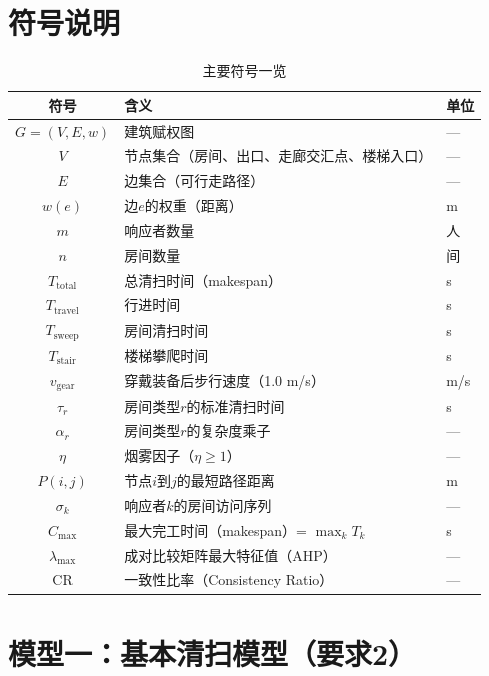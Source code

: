 \documentclass[12pt,a4paper]{ctexart}
\begin{document}
\section{符号说明}

\begin{table}[htbp]
\centering
\caption{主要符号一览}
\label{tab:notation}
\begin{tabular}{cll}
\toprule
\textbf{符号} & \textbf{含义} & \textbf{单位} \\
\midrule
$G=(V,E,w)$ & 建筑赋权图 & — \\
$V$ & 节点集合（房间、出口、走廊交汇点、楼梯入口） & — \\
$E$ & 边集合（可行走路径） & — \\
$w(e)$ & 边$e$的权重（距离） & m \\
$m$ & 响应者数量 & 人 \\
$n$ & 房间数量 & 间 \\
$T_{\text{total}}$ & 总清扫时间（makespan） & s \\
$T_{\text{travel}}$ & 行进时间 & s \\
$T_{\text{sweep}}$ & 房间清扫时间 & s \\
$T_{\text{stair}}$ & 楼梯攀爬时间 & s \\
$v_{\text{gear}}$ & 穿戴装备后步行速度（1.0 m/s） & m/s \\
$\tau_r$ & 房间类型$r$的标准清扫时间 & s \\
$\alpha_r$ & 房间类型$r$的复杂度乘子 & — \\
$\eta$ & 烟雾因子（$\eta\geq 1$） & — \\
$P(i,j)$ & 节点$i$到$j$的最短路径距离 & m \\
$\sigma_k$ & 响应者$k$的房间访问序列 & — \\
$C_{\max}$ & 最大完工时间（makespan）= $\max_k T_k$ & s \\
$\lambda_{\max}$ & 成对比较矩阵最大特征值（AHP） & — \\
$\text{CR}$ & 一致性比率（Consistency Ratio） & — \\
\bottomrule
\end{tabular}
\end{table}

\section{模型一：基本清扫模型（要求2）}
\end{document}
